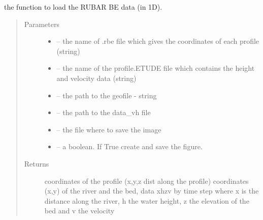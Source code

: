 \documentclass[letterpaper,10pt,english]{sphinxmanual}
\begin{document}
\begin{fulllineitems}
\label{\detokenize{index:src.rubar.load_rubar1d}}
the function to load the RUBAR BE data (in 1D).
\begin{quote}\begin{description}
\item[{Parameters}] \leavevmode\begin{itemize}
\item {} 
 -- the name of .rbe file which gives the coordinates of each profile (string)

\item {} 
 -- the name of the profile.ETUDE file which contains the height and velocity data (string)

\item {} 
 -- the path to the geofile - string

\item {} 
 -- the path to the data\_vh file

\item {} 
 -- the file where to save the image

\item {} 
 -- a boolean. If True create and save the figure.

\end{itemize}

\item[{Returns}] \leavevmode
coordinates of the profile (x,y,z dist along the profile) coordinates (x,y) of the river and the bed,
data xhzv by time step where x is the distance along the river, h the water height, z the elevation of the bed
and v the velocity

\end{description}\end{quote}

\end{fulllineitems}

\end{document}
